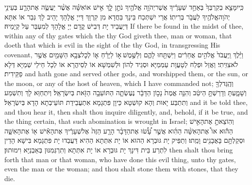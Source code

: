{כִּֽי\maqqaf יִמָּצֵ֤א בְקִרְבְּךָ֙ בְּאַחַ֣ד שְׁעָרֶ֔יךָ אֲשֶׁר\maqqaf יְהֹוָ֥ה אֱלֹהֶ֖יךָ נֹתֵ֣ן לָ֑ךְ אִ֣ישׁ אוֹ\maqqaf אִשָּׁ֗ה אֲשֶׁ֨ר יַעֲשֶׂ֧ה אֶת\maqqaf הָרַ֛ע בְּעֵינֵ֥י יְהֹוָה\maqqaf אֱלֹהֶ֖יךָ לַעֲבֹ֥ר בְּרִיתֽוֹ׃}
{אֲרֵי יִשְׁתְּכַח בֵּינָךְ בַּחֲדָא מִן קִרְוָךְ דַּייָ אֱלָהָךְ יָהֵיב לָךְ גְּבַר אוֹ אִתָּא דְּיַעֲבֵיד יָת דְּבִישׁ קֳדָם יְיָ אֱלָהָךְ לְמִעְבַּר עַל קְיָמֵיהּ׃}
{If there be found in the midst of thee, within any of thy gates which the \lord\space thy God giveth thee, man or woman, that doeth that which is evil in the sight of the \lord\space thy God, in transgressing His covenant,}{}
{וַיֵּ֗לֶךְ וַֽיַּעֲבֹד֙ אֱלֹהִ֣ים אֲחֵרִ֔ים וַיִּשְׁתַּ֖חוּ לָהֶ֑ם וְלַשֶּׁ֣מֶשׁ \legarmeh  א֣וֹ לַיָּרֵ֗חַ א֛וֹ לְכׇל\maqqaf צְבָ֥א הַשָּׁמַ֖יִם אֲשֶׁ֥ר לֹא\maqqaf צִוִּֽיתִי׃}
{וַאֲזַל וּפְלַח לְטָעֲוָת עַמְמַיָּא וּסְגֵיד לְהוֹן וּלְשִׁמְשָׁא אוֹ לְסֵיהֲרָא אוֹ לְכָל חֵילֵי שְׁמַיָּא דְּלָא פַקֵּידִית׃}
{and hath gone and served other gods, and worshipped them, or the sun, or the moon, or any of the host of heaven, which I have commanded not;}{}
{וְהֻֽגַּד\maqqaf לְךָ֖ וְשָׁמָ֑עְתָּ וְדָרַשְׁתָּ֣ הֵיטֵ֔ב וְהִנֵּ֤ה אֱמֶת֙ נָכ֣וֹן הַדָּבָ֔ר נֶעֶשְׂתָ֛ה הַתּוֹעֵבָ֥ה הַזֹּ֖את בְּיִשְׂרָאֵֽל׃}
{וְיִתְחַוַּא לָךְ וְתִשְׁמַע וְתִתְבַּע יָאוּת וְהָא קוּשְׁטָא כֵּיוָן פִּתְגָמָא אִתְעֲבֵידַת תּוֹעֵיבְתָא הָדָא בְּיִשְׂרָאֵל׃}
{and it be told thee, and thou hear it, then shalt thou inquire diligently, and, behold, if it be true, and the thing certain, that such abomination is wrought in Israel;}{}
{וְהֽוֹצֵאתָ֣ אֶת\maqqaf הָאִ֣ישׁ הַה֡וּא אוֹ֩ אֶת\maqqaf הָאִשָּׁ֨ה הַהִ֜וא אֲשֶׁ֣ר עָ֠שׂ֠וּ אֶת\maqqaf הַדָּבָ֨ר הָרָ֤ע הַזֶּה֙ אֶל\maqqaf שְׁעָרֶ֔יךָ אֶת\maqqaf הָאִ֕ישׁ א֖וֹ אֶת\maqqaf הָאִשָּׁ֑ה וּסְקַלְתָּ֥ם בָּאֲבָנִ֖ים וָמֵֽתוּ׃}
{וְתַפֵּיק יָת גּוּבְרָא הַהוּא אוֹ יָת אִתְּתָא הַהִיא דַּעֲבַדוּ יָת פִּתְגָמָא בִּישָׁא הָדֵין לִתְרַע בֵּית דִּינָךְ יָת גּוּבְרָא אוֹ יָת אִתְּתָא וְתִרְגְּמִנּוּן בְּאַבְנַיָּא וִימוּתוּן׃}
{then shalt thou bring forth that man or that woman, who have done this evil thing, unto thy gates, even the man or the woman; and thou shalt stone them with stones, that they die.}{}

